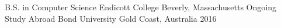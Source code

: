 

\begin{cventries}

  \cventry
    {B.S. in Computer Science} %
    {Endicott College} %
    {Beverly, Massachusetts} %
    {Ongoing} %
    {}
  \vspace{-1.5mm}
  \cventry
    {Study Abroad} %
    {Bond University} %
    {Gold Coast, Australia} %
    {2016} %
    {}

\end{cventries}
